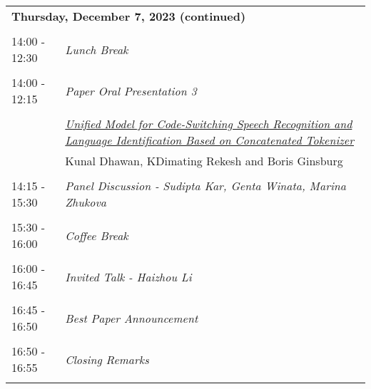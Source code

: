 \documentclass[11pt,oneside]{book}
\begin{document}
          \begin{tabular}{p{24mm}p{124mm}}
    \multicolumn{2}{l}{\bf Thursday, December 7, 2023 (continued)} \\\\
                14:00 - 12:30 & \emph{Lunch Break}\\\\
      
                      14:00 - 12:15 & \emph{Paper Oral Presentation 3}\\\\
      
                
                      & \hyperlink{page.74}{\emph{Unified Model for Code-Switching Speech Recognition and Language Identification Based on Concatenated Tokenizer}}\\
        & Kunal Dhawan\index{Dhawan}, KDimating Rekesh\index{Rekesh} and Boris Ginsburg\index{Ginsburg}\\\\
                      14:15 - 15:30 & \emph{Panel Discussion - Sudipta Kar, Genta Winata, Marina Zhukova}\\\\
      
                      15:30 - 16:00 & \emph{Coffee Break}\\\\
      
                      16:00 - 16:45 & \emph{Invited Talk - Haizhou Li}\\\\
      
                      16:45 - 16:50 & \emph{Best Paper Announcement}\\\\
      
                      16:50 - 16:55 & \emph{Closing Remarks}\\\\
      
              \end{tabular}
    \newpage
      
\end{document}
